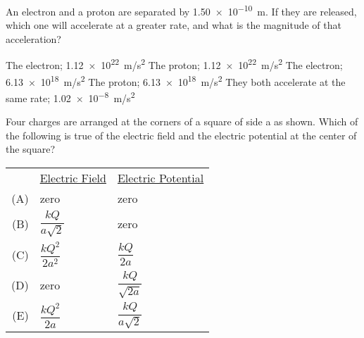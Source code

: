 \documentclass{../../../oss-apphys-exam}
\begin{document}
\begin{multicols*}{2}
\begin{questions}
    \question An electron and a proton are separated by \SI{1.50e-10}{\metre}.
    If they are released, which one will accelerate at a greater rate, and what
    is the magnitude of that acceleration?
    \begin{choices}
      \choice The electron; \SI{1.12e22}{m/s^2}
      \choice The proton; \SI{1.12e22}{m/s^2}
      \choice The electron; \SI{6.13e18}{m/s^2}
      \choice The proton; \SI{6.13e18}{m/s^2}
      \choice They both accelerate at the same rate; \SI{1.02e-8}{m/s^2}
    \end{choices}
   
    \question Four charges are arranged at the corners of a square of side a as
    shown. Which of the following is true of the electric field and the electric
    potential at the center of the square?
    \begin{center}
    \end{center}
    \begin{tabular}{rll}
      & \underline{Electric Field} & \underline{Electric Potential}\\
      (A) & zero & zero \\
      (B) & $\dfrac{kQ}{a\sqrt{2}}$ & zero \\
      (C) & $\dfrac{kQ^2}{2a^2}$ &  $\dfrac{kQ}{2a}$\\
      (D) & zero &  $\dfrac{kQ}{\sqrt{2a}}$\\
      (E) & $\dfrac{kQ^2}{2a}$ & $\dfrac{kQ}{a\sqrt{2}}$
    \end{tabular}
    \columnbreak
   

\end{questions}
\end{multicols*}
\end{document}
